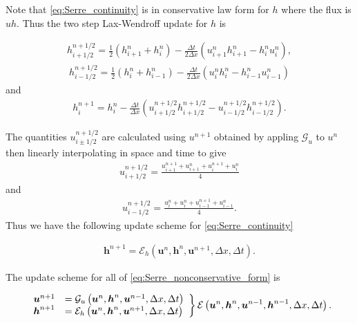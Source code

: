 \documentclass[SingleSpace,12pt,Proceedings]{Serre_ASCE}
\begin{document}
Note that \eqref{eq:Serre_continuity} is in conservative law form for $h$ where the flux is $uh$. Thus the two step Lax-Wendroff update for $h$ is
\begin{linenomath*}
\begin{gather}
h^{n + 1/2}_{i+ 1/2} = \frac{1}{2}\left(h^{n}_{i+1} + h^{n}_i\right) - \frac{\Delta t}{2\Delta x}\left(u^n_{i+1}h^n_{i+1} - h^n_{i}u^n_{i}\right),
\end{gather}
\begin{gather}
h^{n + 1/2}_{i- 1/2} = \frac{1}{2}\left(h^{n}_{i} + h^{n}_{i-1}\right) - \frac{\Delta t}{2\Delta x}\left(u^n_{i}h^n_{i} - h^n_{i-1}u^n_{i-1}\right)
\end{gather}
and
\begin{gather}
h^{n+1}_i = h^{n}_i - \frac{\Delta t}{\Delta x}\left(u^{n + 1/2}_{i+ 1/2}h^{n + 1/2}_{i+ 1/2} - u^{n + 1/2}_{i- 1/2}h^{n + 1/2}_{i- 1/2}\right).
\label{eq:LW4h}
\end{gather}
\end{linenomath*}
The quantities $u^{n + 1/2}_{i \pm 1/2}$ are calculated using $u^{n+1}$ obtained by appling $\mathcal{G}_u$ to $u^n$ then linearly interpolating in space and time to give
\begin{gather}
u^{n + 1/2}_{i+ 1/2} = \frac{u^{n+1}_{i+1} + u^{n}_{i+1} + u^{n+1}_{i} + u^{n}_{i} }{4}
\end{gather}
and
\begin{gather}
u^{n + 1/2}_{i- 1/2} = \frac{u^{n}_{i} + u^{n}_{i} + u^{n+1}_{i-1}+ u^{n}_{i-1} }{4}.
\end{gather}
Thus we have the following update scheme for \eqref{eq:Serre_continuity}
\begin{linenomath*}
	\begin{gather}
	\boldsymbol{h}^{n+1} = \mathcal{E}_h\left(\boldsymbol{u}^n,\boldsymbol{h}^n,\boldsymbol{u}^{n+1}, \Delta x, \Delta t \right). 
	\end{gather}
\end{linenomath*}
The update scheme for all of \eqref{eq:Serre_nonconservative_form} is
\begin{linenomath*}
\begin{gather}
	\left.
	\begin{array}{l l}
	\boldsymbol{u}^{n+1}&=\mathcal{G}_u\left(\boldsymbol{u}^n,\boldsymbol{h}^n, \boldsymbol{u}^{n-1}, \Delta x, \Delta t \right) \\
	\boldsymbol{h}^{n+1}&=\mathcal{E}_h\left(\boldsymbol{u}^n,\boldsymbol{h}^n,\boldsymbol{u}^{n+1}, \Delta x, \Delta t \right)
	\end{array} \right\rbrace \mathcal{E}\left(\boldsymbol{u}^n,\boldsymbol{h}^n, \boldsymbol{u}^{n-1},\boldsymbol{h}^{n-1}, \Delta x, \Delta t \right).
\end{gather}
\end{linenomath*}
\end{document}
